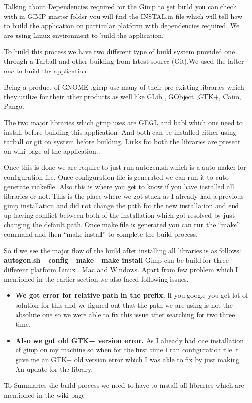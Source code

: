 Talking about Dependencies required for the Gimp to get build you can check with in GIMP master folder you will find the INSTAL.in file which will tell how to build the application on particular platform with dependencies required. We are using Linux environment to build the application.

To build this process we have two different type of	build system provided one through a Tarball and other  building from latest source (Git).We used the latter one to build the application.

Being a product of GNOME ,gimp use many of their pre existing libraries which they utilize for their other products  as well like GLib , GObject ,GTK+, Cairo, Pango. 

The two major libraries which gimp uses are GEGL and babl which one need to install before building this application. And both can be installed either using tarball or git on system before building. Links for both the libraries are present on wiki page of the application.\cite{wiki}.

Once this is done we are require to just run autogen.sh which is a auto maker for configuration file. Once configuration file is generated we can run it to auto generate makefile. Also this is where you get to know if you have installed all libraries or not. This is the place where we got stuck as I already had a previous gimp installation and did not change the path for the new installation and end up having conflict between both of the installation which got resolved by just changing the default path. Once make file is generated you can run the “make” command  and then “make install”  to complete the build process.

So if we see the major flow of the build after installing all libraries is as follows:
\newline
\textbf{ autogen.sh---config---make---make install}
\newline
\newline
Gimp can be build for three different platform Linux , Mac and Windows. Apart from few problem which I mentioned in the earlier section we also faced following issues.
\begin{itemize}
\item \textbf {We got error for relative path in the prefix.}
If you google you get lot of solution for this and we figured out that the path we are using is not the absolute one so we were able to fix this issue after searching for two three time.
\item \textbf{ Also we got old GTK+ version error. }
As I already had one installation of gimp on my machine 
so when for the first time I ran configuration file it gave me an      
GTK+ old version error which I was able to fix by just making 
An update for the library.
	
\end{itemize}
To Summaries the build process we need to have to install all libraries which are mentioned in the wiki page


